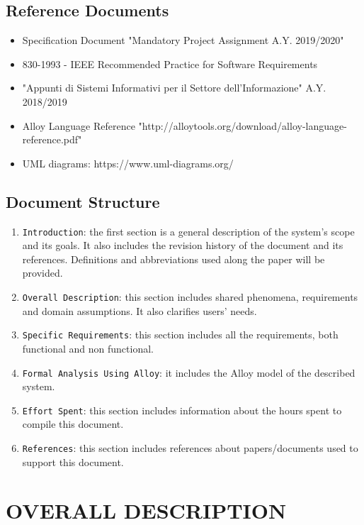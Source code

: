 \documentclass[12pt,a4paper]{article}
\begin{document}
\subsection{Reference	Documents} 
\begin{itemize}
				\item Specification Document "Mandatory Project Assignment A.Y. 2019/2020"
				\item 830-1993 - IEEE Recommended Practice for Software Requirements
				\item "Appunti di Sistemi Informativi per il Settore dell'Informazione" A.Y. 2018/2019
				\item Alloy Language Reference "http://alloytools.org/download/alloy-language-reference.pdf"
				\item UML diagrams: https://www.uml-­diagrams.org/
			\end{itemize}
\subsection{Document	Structure} 
\begin{enumerate}
			\item \texttt{Introduction}: the first section is a general description of the system's scope and its goals. It also includes the revision history of the document and its references. Definitions and abbreviations used along the paper will be provided.
			\item \texttt{Overall Description}: this section includes shared phenomena, requirements and domain assumptions. It also clarifies users' needs.
			\item \texttt{Specific Requirements}: this section includes all the requirements, both functional and non functional.
			\item \texttt{Formal Analysis Using Alloy}: it includes the Alloy model of the described system.
			\item \texttt{Effort Spent}: this section includes information about the hours spent to compile this document.
			\item \texttt{References}: this section includes references about papers/documents used to support this document.
		\end{enumerate}
\newpage
\section{OVERALL	DESCRIPTION}
\end{document}
